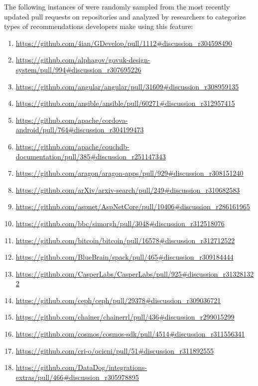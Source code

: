 The following instances of \suggs were randomly sampled from the most recently updated pull requests on repositories and analyzed by researchers to categorize types of recommendations developers make using this feature:

{\footnotesize
\begin{enumerate}[topsep=0pt,itemsep=-1ex,partopsep=1ex,parsep=1ex]
     \item \url{https://github.com/4ian/GDevelop/pull/1112\#discussion_r304598490}
    \item \url{https://github.com/alphagov/govuk-design-system/pull/994\#discussion_r307695226}
    \item \url{https://github.com/angular/angular/pull/31609\#discussion_r308959135}
    \item \url{https://github.com/ansible/ansible/pull/60271\#discussion_r312957415}
    \item \url{https://github.com/apache/cordova-android/pull/764\#discussion_r304199473}
    \item \url{https://github.com/apache/couchdb-documentation/pull/385\#discussion_r251147343}
    \item \url{https://github.com/aragon/aragon-apps/pull/929\#discussion_r308151240}
    \item \url{https://github.com/arXiv/arxiv-search/pull/249\#discussion_r310682583}
    \item \url{https://github.com/aspnet/AspNetCore/pull/10406\#discussion_r286161965}
    \item \url{https://github.com/bbc/simorgh/pull/3048\#discussion_r312518076}
    \item \url{https://github.com/bitcoin/bitcoin/pull/16578\#discussion_r312712522}
    \item \url{https://github.com/BlueBrain/spack/pull/465\#discussion_r309184444}
    \item \url{https://github.com/CasperLabs/CasperLabs/pull/925\#discussion_r313281322}
    \item \url{https://github.com/ceph/ceph/pull/29378\#discussion_r309036721}
    \item \url{https://github.com/chainer/chainerrl/pull/436\#discussion_r299015299}
    \item \url{https://github.com/cosmos/cosmos-sdk/pull/4514\#discussion_r311556341}
    \item \url{https://github.com/cri-o/ocicni/pull/51\#discussion_r311892555}
    \item \url{https://github.com/DataDog/integrations-extras/pull/466\#discussion_r305978895}

\end{enumerate}}

